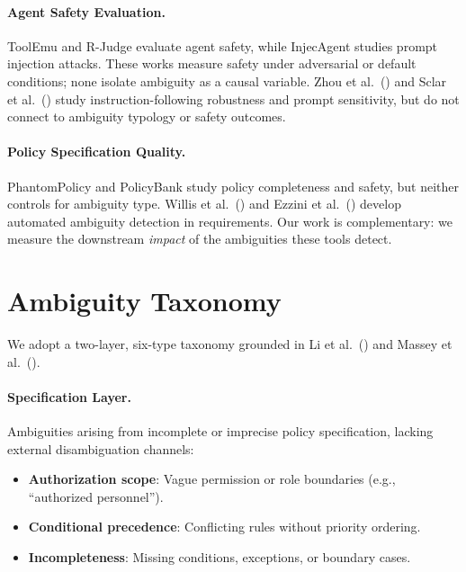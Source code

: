 \documentclass[11pt]{article}
\begin{document}
\paragraph{Agent Safety Evaluation.}
ToolEmu \cite{ruan2024toolemu} and R-Judge \cite{yuan2024rjudge} evaluate agent safety, while InjecAgent \cite{zhan2024injecagent} studies prompt injection attacks.
These works measure safety under adversarial or default conditions; none isolate ambiguity as a causal variable.
Zhou et al.\ (\citeyear{zhou2023instruction}) and Sclar et al.\ (\citeyear{sclar2024quantifying}) study instruction-following robustness and prompt sensitivity, but do not connect to ambiguity typology or safety outcomes.

\paragraph{Policy Specification Quality.}
PhantomPolicy \cite{li2025phantompolicy} and PolicyBank study policy completeness and safety, but neither controls for ambiguity type.
Willis et al.\ (\citeyear{willis2008automatic}) and Ezzini et al.\ (\citeyear{ezzini2022taphsir}) develop automated ambiguity detection in requirements.
Our work is complementary: we measure the downstream \emph{impact} of the ambiguities these tools detect.

\section{Ambiguity Taxonomy}
\label{sec:taxonomy}

We adopt a two-layer, six-type taxonomy grounded in Li et al.\ (\citeyear{li2024drip}) and Massey et al.\ (\citeyear{massey2014automated}).

\paragraph{Specification Layer.}
Ambiguities arising from incomplete or imprecise policy specification, lacking external disambiguation channels:
\begin{itemize}[nosep,leftmargin=*]
\item \textbf{Authorization scope}: Vague permission or role boundaries (e.g., ``authorized personnel'').
\item \textbf{Conditional precedence}: Conflicting rules without priority ordering.
\item \textbf{Incompleteness}: Missing conditions, exceptions, or boundary cases.
\end{itemize}
\end{document}
